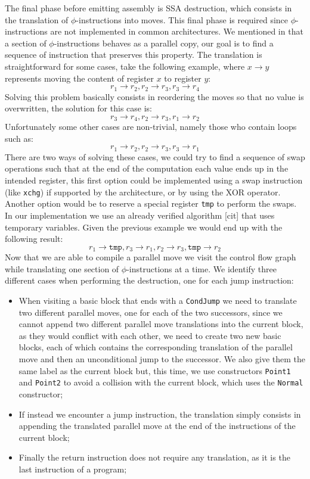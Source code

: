 The final phase before emitting assembly is SSA destruction, which consists in the translation of $\phi$-instructions into moves. This final phase is required since $\phi$-instructions are not implemented in common architectures.
We mentioned in  that a section of $\phi$-instructions behaves as a parallel copy, our goal is to find a sequence of instruction that preserves this property. The translation is straightforward for some cases, take the following example, where $x \to y$ represents moving the content of register $x$ to register $y$:
\[
  r_1 \to r_2, r_2 \to r_3, r_3 \to r_4
\]
Solving this problem basically consists in reordering the moves so that no value is overwritten, the solution for this case is:
\[
  r_3 \to r_4, r_2 \to r_3, r_1 \to r_2
\]
Unfortunately some other cases are non-trivial, namely those who contain loops such as:
\[
  r_1 \to r_2, r_2 \to r_3, r_3 \to r_1
\]
There are two ways of solving these cases, we could try to find a sequence of swap operations such that at the end of the computation each value ends up in the intended register, this first option could be implemented using a swap instruction (like \texttt{xchg}) if supported by the architecture, or by using the XOR operator. Another option would be to reserve a special register \texttt{tmp} to perform the swaps. In our implementation we use an already verified algorithm [cit] that uses temporary variables. Given the previous example we would end up with the following result:
\[
  r_1 \to \texttt{tmp}, r_3 \to r_1, r_2 \to r_3, \texttt{tmp} \to r_2
\]
Now that we are able to compile a parallel move we visit the control flow graph while translating one section of $\phi$-instructions at a time.
We identify three different cases when performing the destruction, one for each jump instruction:
\begin{itemize}
  \item When visiting a basic block that ends with a \texttt{CondJump} we need to translate two different parallel moves, one for each of the two successors, since we cannot append two different parallel move translations into the current block, as they would conflict with each other, we need to create two new basic blocks, each of which contains the corresponding translation of the parallel move and then an unconditional jump to the successor. We also give them the same label as the current block but, this time, we use constructors \texttt{Point1} and \texttt{Point2} to avoid a collision with the current block, which uses the \texttt{Normal} constructor;
  \item If instead we encounter a jump instruction, the translation simply consists in appending the translated parallel move at the end of the instructions of the current block;
  \item Finally the return instruction does not require any translation, as it is the last instruction of a program;
\end{itemize}

